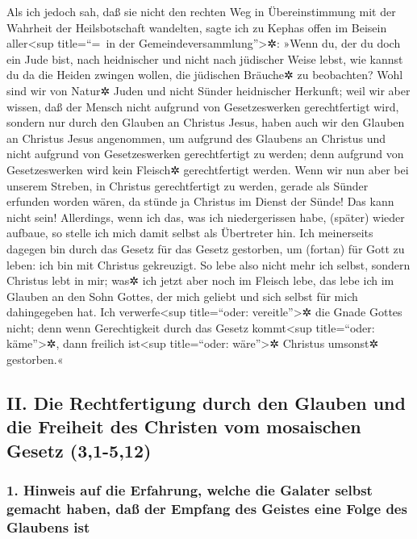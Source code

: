  Als ich jedoch sah, daß sie nicht den rechten Weg in
Übereinstimmung mit der Wahrheit der Heilsbotschaft wandelten, sagte ich
zu Kephas offen im Beisein aller\textless sup title=``=~in der
Gemeindeversammlung''\textgreater✲: »Wenn du, der du doch ein Jude bist,
nach heidnischer und nicht nach jüdischer Weise lebst, wie kannst du da
die Heiden zwingen wollen, die jüdischen Bräuche✲ zu beobachten?
 Wohl sind wir von Natur✲ Juden und nicht Sünder
heidnischer Herkunft;  weil wir aber wissen, daß der
Mensch nicht aufgrund von Gesetzeswerken gerechtfertigt wird, sondern
nur durch den Glauben an Christus Jesus, haben auch wir den Glauben an
Christus Jesus angenommen, um aufgrund des Glaubens an Christus und
nicht aufgrund von Gesetzeswerken gerechtfertigt zu werden; denn
aufgrund von Gesetzeswerken wird kein Fleisch✲ gerechtfertigt werden.
 Wenn wir nun aber bei unserem Streben, in Christus
gerechtfertigt zu werden, gerade als Sünder erfunden worden wären, da
stünde ja Christus im Dienst der Sünde! Das kann nicht sein!
 Allerdings, wenn ich das, was ich niedergerissen habe,
(später) wieder aufbaue, so stelle ich mich damit selbst als Übertreter
hin.  Ich meinerseits dagegen bin durch das Gesetz für
das Gesetz gestorben, um (fortan) für Gott zu leben: ich bin mit
Christus gekreuzigt.  So lebe also nicht mehr ich selbst,
sondern Christus lebt in mir; was✲ ich jetzt aber noch im Fleisch lebe,
das lebe ich im Glauben an den Sohn Gottes, der mich geliebt und sich
selbst für mich dahingegeben hat.  Ich
verwerfe\textless sup title=``oder: vereitle''\textgreater✲ die Gnade
Gottes nicht; denn wenn Gerechtigkeit durch das Gesetz
kommt\textless sup title=``oder: käme''\textgreater✲, dann freilich
ist\textless sup title=``oder: wäre''\textgreater✲ Christus umsonst✲
gestorben.«

\hypertarget{ii.-die-rechtfertigung-durch-den-glauben-und-die-freiheit-des-christen-vom-mosaischen-gesetz-31-512}{%
\subsection{II. Die Rechtfertigung durch den Glauben und die Freiheit
des Christen vom mosaischen Gesetz
(3,1-5,12)}\label{ii.-die-rechtfertigung-durch-den-glauben-und-die-freiheit-des-christen-vom-mosaischen-gesetz-31-512}}

\hypertarget{hinweis-auf-die-erfahrung-welche-die-galater-selbst-gemacht-haben-dauxdf-der-empfang-des-geistes-eine-folge-des-glaubens-ist}{%
\subsubsection{1. Hinweis auf die Erfahrung, welche die Galater selbst
gemacht haben, daß der Empfang des Geistes eine Folge des Glaubens
ist}\label{hinweis-auf-die-erfahrung-welche-die-galater-selbst-gemacht-haben-dauxdf-der-empfang-des-geistes-eine-folge-des-glaubens-ist}}

